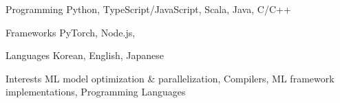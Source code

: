 

\begin{cvskills}

  \cvskill
  {Programming} %
  {Python, TypeScript/JavaScript, Scala, Java, C/C++} %

  \cvskill
  {Frameworks} %
  {PyTorch, Node.js, } %

  \cvskill
  {Languages} %
  {Korean, English, Japanese} %

  \cvskill
  {Interests} %
  {ML model optimization \& parallelization, Compilers, ML framework implementations, Programming Languages} %

\end{cvskills}
